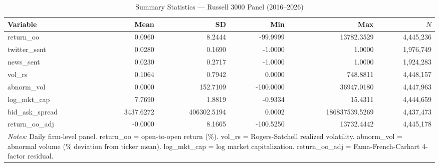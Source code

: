 \begin{table}[htbp]
\centering
\caption{Summary Statistics --- Russell 3000 Panel (2016--2026)}
\label{tab:russel_sumstats}
\begin{tabular}{lrrrrr}
\hline\hline
Variable & Mean & SD & Min & Max & $N$ \\
\hline
  return\_oo & 0.0960 & 8.2444 & -99.9999 & 13782.3529 & 4,445,236 \\
  twitter\_sent & 0.0280 & 0.1690 & -1.0000 & 1.0000 & 1,976,749 \\
  news\_sent & 0.0230 & 0.2717 & -1.0000 & 1.0000 & 1,924,283 \\
  vol\_rs & 0.1064 & 0.7942 & 0.0000 & 748.8811 & 4,448,157 \\
  abnorm\_vol & 0.0000 & 152.7109 & -100.0000 & 36947.0180 & 4,447,963 \\
  log\_mkt\_cap & 7.7690 & 1.8819 & -0.9334 & 15.4311 & 4,444,659 \\
  bid\_ask\_spread & 3437.6272 & 406302.5194 & 0.0002 & 186837539.5269 & 4,437,473 \\
  return\_oo\_adj & -0.0000 & 8.1665 & -100.5250 & 13732.4442 & 4,445,178 \\
\hline\hline
\multicolumn{6}{p{0.95\linewidth}}{\footnotesize \textit{Notes:} Daily firm-level panel. return\_oo = open-to-open return (\%). vol\_rs = Rogers-Satchell realized volatility. abnorm\_vol = abnormal volume (\% deviation from ticker mean). log\_mkt\_cap = log market capitalization. return\_oo\_adj = Fama-French-Carhart 4-factor residual.} \\
\end{tabular}
\end{table}